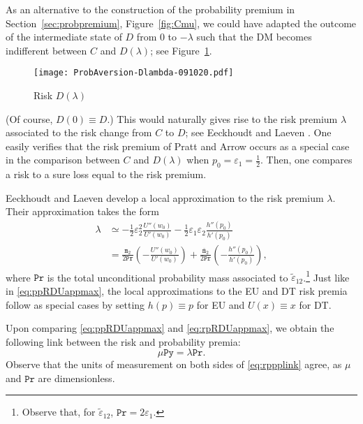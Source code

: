 \documentclass[11pt]{article}
\begin{document}
As an alternative to the construction of the probability premium in Section~\ref{sec:probpremium}, Figure~\ref{fig:Cmu},
we could have adapted the outcome of the intermediate state of $D$ from 0 to $-\lambda$
such that the DM becomes indifferent between $C$ and $D(\lambda)$; see Figure~\ref{fig:Dlambda}.
\vskip -0.5cm
\begin{figure}[H]
\begin{center}
\caption{Risk $D(\lambda)$
}
\vskip 0.4cm
\texttt{[image: ProbAversion-Dlambda-091020.pdf]}
\label{fig:Dlambda}
\end{center}
\end{figure}
\noindent (Of course, $D(0)\equiv D$.)
This would naturally gives rise to the risk premium $\lambda$ associated to the risk change from $C$ to $D$;
see Eeckhoudt and Laeven \cite{EL20}.
One easily verifies that the risk premium of Pratt \cite{P64} and Arrow \cite{A65,A71} occurs as a special case
in the comparison between $C$ and $D(\lambda)$ when $p_{0}=\varepsilon_{1}=\tfrac{1}{2}$.
Then, one compares a risk to a sure loss equal to the risk premium. %

Eeckhoudt and Laeven \cite{EL20} develop a local approximation to the risk premium $\lambda$.
Their approximation takes the form
\begin{align}
\lambda &\simeq -\frac{1}{2}\varepsilon_{2}^{2}\frac{U''(w_{0})}{U'(w_{0})}-\frac{1}{2}\varepsilon_{1}\varepsilon_{2}\frac{h''(p_{0})}{h'(p_{0})}\nonumber\\
&=\frac{\texttt{m}_{2}}{2\texttt{Pr}}\left(-\frac{U''(w_{0})}{U'(w_{0})}\right)
+\frac{\bar{\texttt{m}}_{2}}{2\texttt{Pr}}\left(-\frac{h''(p_{0})}{h'(p_{0})}\right),
\label{eq:rpRDUappmax}
\end{align}
where $\texttt{Pr}$ is the total unconditional probability mass associated to $\tilde{\varepsilon}_{12}$.\footnote{Observe that,
for $\tilde{\varepsilon}_{12}$, $\texttt{Pr}=2\varepsilon_{1}$.}
Just like in \eqref{eq:ppRDUappmax}, the local approximations to the EU and DT risk premia
follow as special cases by setting $h(p)\equiv p$ for EU and $U(x)\equiv x$ for DT.

Upon comparing \eqref{eq:ppRDUappmax} and \eqref{eq:rpRDUappmax},
we obtain the following link between the risk and probability premia:
\begin{equation}
\mu\texttt{Py} = \lambda\texttt{Pr}.
\label{eq:rppplink}
\end{equation}
Observe that the units of measurement on both sides of \eqref{eq:rppplink} agree,
as $\mu$ and $\texttt{Pr}$ are dimensionless.
\end{document}
